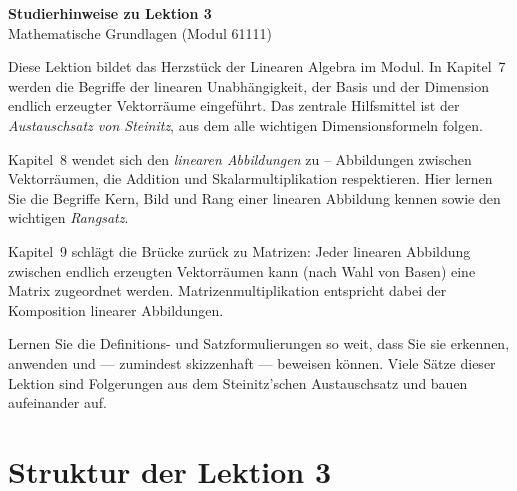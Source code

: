 \documentclass[a4paper,12pt]{article}
\begin{document}
\begin{center}
  {\LARGE\bfseries Studierhinweise zu Lektion 3}\\[0.5em]
  {\large Mathematische Grundlagen (Modul 61111)}
\end{center}

\vspace{1em}

Diese Lektion bildet das Herzstück der Linearen Algebra im Modul. In
Kapitel~7 werden die Begriffe der linearen Unabhängigkeit, der Basis und der
Dimension endlich erzeugter Vektorräume eingeführt. Das zentrale Hilfsmittel
ist der \emph{Austauschsatz von Steinitz}, aus dem alle wichtigen
Dimensionsformeln folgen.

Kapitel~8 wendet sich den \emph{linearen Abbildungen} zu – Abbildungen
zwischen Vektorräumen, die Addition und Skalarmultiplikation respektieren.
Hier lernen Sie die Begriffe Kern, Bild und Rang einer linearen Abbildung
kennen sowie den wichtigen \emph{Rangsatz}.

Kapitel~9 schlägt die Brücke zurück zu Matrizen: Jeder linearen Abbildung
zwischen endlich erzeugten Vektorräumen kann (nach Wahl von Basen) eine
Matrix zugeordnet werden. Matrizenmultiplikation entspricht dabei der
Komposition linearer Abbildungen.

Lernen Sie die Definitions- und Satzformulierungen so weit, dass Sie sie
erkennen, anwenden und — zumindest skizzenhaft — beweisen können. Viele
Sätze dieser Lektion sind Folgerungen aus dem Steinitz'schen Austauschsatz
und bauen aufeinander auf.

\section*{Struktur der Lektion 3}
\end{document}
